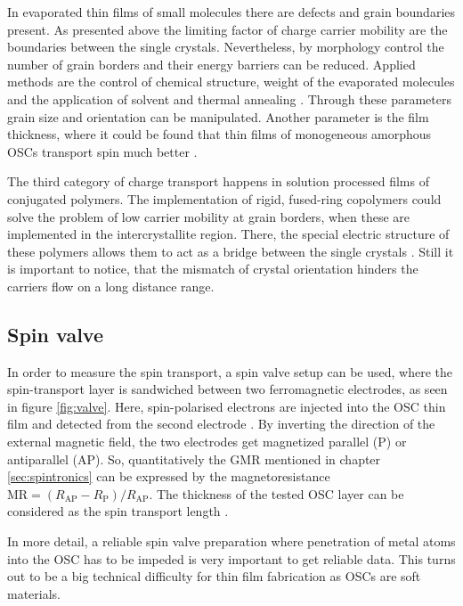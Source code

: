In evaporated thin films of small molecules there are defects and grain boundaries present.
As presented above the limiting factor of charge carrier mobility are the boundaries between the single crystals.
Nevertheless, by morphology control the number of grain borders and their energy barriers can be reduced.
Applied methods are the control of chemical structure, weight of the evaporated molecules and the application of solvent and thermal annealing \cite{morphology}.
Through these parameters grain size and orientation can be manipulated.
Another parameter is the film thickness, where it could be found that thin films of monogeneous amorphous OSCs transport spin much better \cite{appl-organic}.

The third category of charge transport happens in solution processed films of conjugated polymers.
The implementation of rigid, fused-ring copolymers could solve the problem of low carrier mobility at grain borders, when these are implemented in the intercrystallite region.
There, the special electric structure of these polymers allows them to act as a bridge between the single crystals \cite{perovskite}.
Still it is important to notice, that the mismatch of crystal orientation hinders the carriers flow on a long distance range.

\subsection{Spin valve}

In order to measure the spin transport, a spin valve setup can be used, where the spin-transport layer is sandwiched between two ferromagnetic electrodes, as seen in figure \ref{fig:valve}.
Here, spin-polarised electrons are injected into the OSC thin film and detected from the second electrode \cite{appl-organic}.
By inverting the direction of the external magnetic field, the two electrodes get magnetized parallel (P) or antiparallel (AP).
So, quantitatively the GMR mentioned in chapter \ref{sec:spintronics} can be expressed by the magnetoresistance $\text{MR} = (R_\text{AP}-R_\text{P})/R_\text{AP}$.
The thickness of the tested OSC layer can be considered as the spin transport length \cite{appl-organic}.

In more detail, a reliable spin valve preparation where penetration of metal atoms into the OSC has to be impeded is very important to get reliable data.
This turns out to be a big technical difficulty for thin film fabrication as OSCs are soft materials. 


